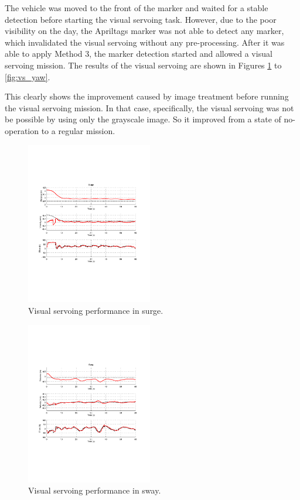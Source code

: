 \documentclass[conference, letterpaper]{IEEEtran}
\begin{document}
The vehicle was moved to the front of the marker and waited for a stable
detection before starting the visual servoing task. However, due to the poor
visibility on the day, the Apriltags marker was not able to detect any marker,
which invalidated the visual servoing without any pre-processing. After it was
able to apply Method 3, the marker detection started and allowed a visual
servoing mission. The results of the visual servoing are shown in Figures
\ref{fig:vs_surge} to \ref{fig:vs_yaw}.

This clearly shows the improvement caused by image treatment before
running the visual servoing mission. In that case, specifically, the visual
servoing was not be possible by using only the grayscale image. So it improved
from a state of no-operation to a regular mission.

\begin{figure}[!ht]
	\centering
    \includegraphics[width=0.49\textwidth, trim={1.6cm 6.9cm 2.3cm 6.7cm}]{./fig/vs_surge_emb.pdf}
    \caption{Visual servoing performance in surge.}
	\label{fig:vs_surge}
\end{figure}
\begin{figure}[!ht]
	\centering
    \includegraphics[width=0.49\textwidth, trim={1.6cm 6.9cm 2.3cm 6.7cm}]{./fig/vs_sway_emb.pdf}
    \caption{Visual servoing performance in sway.}
	\label{fig:vs_sway}
\end{figure}
\end{document}
